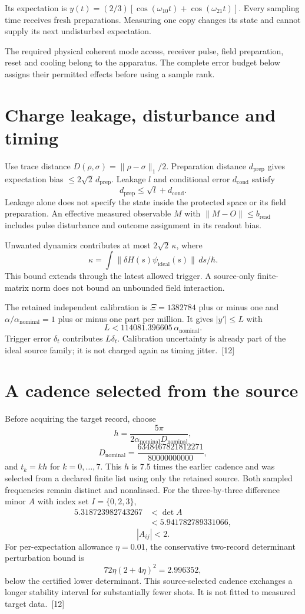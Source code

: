 \documentclass[10pt,twocolumn,letterpaper]{article}
\begin{document}
Its expectation is $y(t)=(2/3)[\cos(\omega_{10}t)+\cos(\omega_{21}t)]$. Every sampling time receives fresh preparations. Measuring one copy changes its state and cannot supply its next undisturbed expectation.

The required physical coherent mode access, receiver pulse, field preparation, reset and cooling belong to the apparatus. The complete error budget below assigns their permitted effects before using a sample rank.

\section{Charge leakage, disturbance and timing}
Use trace distance $D(\rho,\sigma)=\lVert\rho-\sigma\rVert_1/2$. Preparation distance $d_{\mathrm{prep}}$ gives expectation bias $\leq2\sqrt2\,d_{\mathrm{prep}}$. Leakage $l$ and conditional error $d_{\mathrm{cond}}$ satisfy
\[
d_{\mathrm{prep}}\leq\sqrt l+d_{\mathrm{cond}}.
\]
Leakage alone does not specify the state inside the protected space or its field preparation. An effective measured observable $M$ with $\lVert M-O\rVert\leq b_{\mathrm{read}}$ includes pulse disturbance and outcome assignment in its readout bias.

Unwanted dynamics contributes at most $2\sqrt2\,\kappa$, where
\[
\kappa=\int\lVert\delta H(s)\psi_{\mathrm{ideal}}(s)\rVert\,ds/\hbar.
\]
This bound extends through the latest allowed trigger. A source-only finite-matrix norm does not bound an unbounded field interaction.

The retained independent calibration is $\Xi=1382784$ plus or minus one and $\alpha/\alpha_{\mathrm{nominal}}=1$ plus or minus one part per million. It gives $|y'|\leq L$ with
\[
L<114081.396605\,\alpha_{\mathrm{nominal}}.
\]
Trigger error $\delta_t$ contributes $L\delta_t$. Calibration uncertainty is already part of the ideal source family; it is not charged again as timing jitter.~[12]

\section{A cadence selected from the source}
Before acquiring the target record, choose
\[
h=\frac{5\pi}{2\alpha_{\mathrm{nominal}}D_{\mathrm{nominal}}},
\]
\[
D_{\mathrm{nominal}}=\frac{6348467821812271}{80000000000},
\]
and $t_k=kh$ for $k=0,\ldots,7$. This $h$ is 7.5 times the earlier cadence and was selected from a declared finite list using only the retained source. Both sampled frequencies remain distinct and nonaliased. For the three-by-three difference minor $A$ with index set $I=\{0,2,3\}$,
\[
\begin{aligned}
5.318723982743267&<\det A\\
&<5.941782789331066,
\end{aligned}
\]
\[
|A_{ij}|<2.
\]
For per-expectation allowance $\eta=0.01$, the conservative two-record determinant perturbation bound is
\[
72\eta(2+4\eta)^2=2.996352,
\]
below the certified lower determinant. This source-selected cadence exchanges a longer stability interval for substantially fewer shots. It is not fitted to measured target data.~[12]
\end{document}
